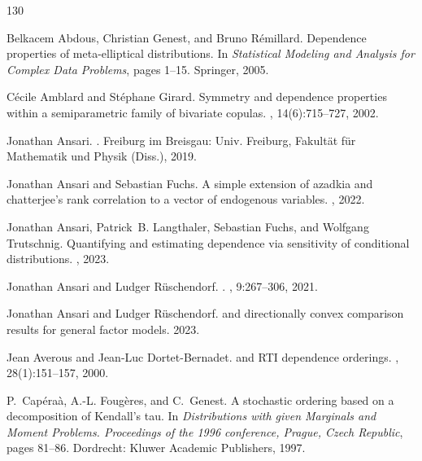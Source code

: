 \documentclass{article}
\begin{document}
\begin{thebibliography}{130}

    Belkacem Abdous, Christian Genest, and Bruno R{\'e}millard.
    \newblock Dependence properties of meta-elliptical distributions.
    \newblock In {\em Statistical Modeling and Analysis for Complex Data Problems},
      pages 1--15. Springer, 2005.
    
    C{\'e}cile Amblard and St{\'e}phane Girard.
    \newblock Symmetry and dependence properties within a semiparametric family of
      bivariate copulas.
    , 14(6):715--727, 2002.

    Jonathan Ansari.
    .
    \newblock Freiburg im Breisgau: Univ. Freiburg, Fakult{\"a}t f{\"u}r Mathematik
    und Physik (Diss.), 2019.

    Jonathan Ansari and Sebastian Fuchs.
    \newblock A simple extension of azadkia and chatterjee's rank correlation to a
      vector of endogenous variables.
    , 2022.
    
    Jonathan Ansari, Patrick~B. Langthaler, Sebastian Fuchs, and Wolfgang
      Trutschnig.
    \newblock Quantifying and estimating dependence via sensitivity of conditional
      distributions.
    , 2023.

    Jonathan {Ansari} and Ludger {R\"uschendorf}.
    .
    , 9:267--306, 2021.
    
    Jonathan {Ansari} and Ludger {R\"uschendorf}.
     and directionally convex comparison results for
      general factor models.
     2023.

    Jean Averous and Jean-Luc Dortet-Bernadet.
     and {RTI} dependence orderings.
    , 28(1):151--157, 2000.

    P.~Cap{\'e}ra{\`a}, A.-L. Foug{\`e}res, and C.~Genest.
    \newblock A stochastic ordering based on a decomposition of {Kendall}'s tau.
    \newblock In {\em Distributions with given Marginals and Moment Problems.
    Proceedings of the 1996 conference, Prague, Czech Republic}, pages 81--86.
    Dordrecht: Kluwer Academic Publishers, 1997.


\end{thebibliography}
\end{document}
